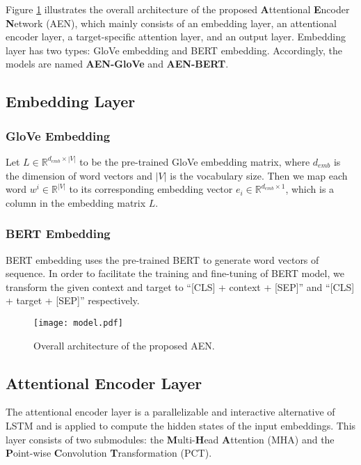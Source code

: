 \documentclass[11pt,a4paper]{article}
\begin{document}
Figure \ref{fig:model} illustrates the overall architecture of the proposed \textbf{A}ttentional \textbf{E}ncoder \textbf{N}etwork (AEN), which mainly consists of an embedding layer, an attentional encoder layer, a target-specific attention layer, and an output layer.
Embedding layer has two types: GloVe embedding and BERT embedding.
Accordingly, the models are named \textbf{AEN-GloVe} and \textbf{AEN-BERT}.

\subsection{Embedding Layer}

\subsubsection{GloVe Embedding}

Let $L \in \mathbb{R}^{d_{emb} \times |V|}$ to be the pre-trained GloVe \cite{pennington2014glove} embedding matrix,
where $d_{emb}$ is the dimension of word vectors and $|V|$ is the vocabulary size.
Then we map each word $w^i \in \mathbb{R}^{|V|}$ to its corresponding embedding vector $e_i \in \mathbb{R}^{d_{emb} \times 1}$,
which is a column in the embedding matrix $L$.

\subsubsection{BERT Embedding}

BERT embedding uses the pre-trained BERT to generate word vectors of sequence.
In order to facilitate the training and fine-tuning of BERT model,
we transform the given context and target to
``[CLS] + context + [SEP]'' and ``[CLS] + target + [SEP]'' respectively.

\begin{figure}
\centering
\texttt{[image: model.pdf]}
\caption{Overall architecture of the proposed AEN.}
\label{fig:model}
\end{figure}

\subsection{Attentional Encoder Layer} \label{Attentional Encoder}

The attentional encoder layer is a parallelizable and interactive alternative of LSTM
and is applied to compute the hidden states of the input embeddings.
This layer consists of two submodules:
the \textbf{M}ulti-\textbf{H}ead \textbf{A}ttention (MHA) and the \textbf{P}oint-wise \textbf{C}onvolution \textbf{T}ransformation (PCT).
\end{document}
